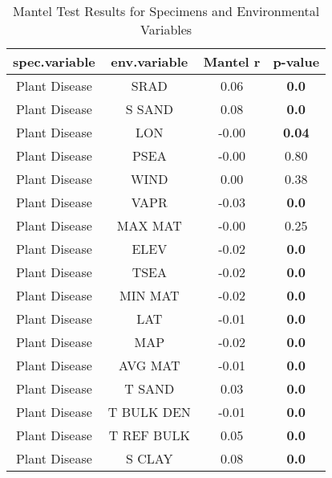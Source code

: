 \begin{table}[H]
\centering
\caption{Mantel Test Results for Specimens and Environmental Variables}
\begin{tabular}{cccc}
\toprule
spec.variable & env.variable & Mantel r & p-value \\
\midrule
Plant Disease & SRAD & 0.06 & \textbf{0.0} \\
Plant Disease & S SAND & 0.08 & \textbf{0.0} \\
Plant Disease & LON & -0.00 & \textbf{0.04} \\
Plant Disease & PSEA & -0.00 & 0.80 \\
Plant Disease & WIND & 0.00 & 0.38 \\
Plant Disease & VAPR & -0.03 & \textbf{0.0} \\
Plant Disease & MAX MAT & -0.00 & 0.25 \\
Plant Disease & ELEV & -0.02 & \textbf{0.0} \\
Plant Disease & TSEA & -0.02 & \textbf{0.0} \\
Plant Disease & MIN MAT & -0.02 & \textbf{0.0} \\
Plant Disease & LAT & -0.01 & \textbf{0.0} \\
Plant Disease & MAP & -0.02 & \textbf{0.0} \\
Plant Disease & AVG MAT & -0.01 & \textbf{0.0} \\
Plant Disease & T SAND & 0.03 & \textbf{0.0} \\
Plant Disease & T BULK DEN & -0.01 & \textbf{0.0} \\
Plant Disease & T REF BULK & 0.05 & \textbf{0.0} \\
Plant Disease & S CLAY & 0.08 & \textbf{0.0} \\
\bottomrule
\end{tabular}
\end{table}